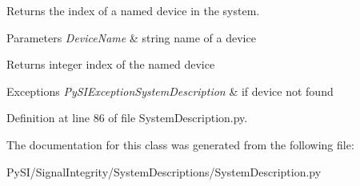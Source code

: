 Returns the index of a named device in the system. 


\begin{DoxyParams}{Parameters}
{\em Device\+Name} & string name of a device \\
\hline
\end{DoxyParams}
\begin{DoxyReturn}{Returns}
integer index of the named device 
\end{DoxyReturn}

\begin{DoxyExceptions}{Exceptions}
{\em Py\+S\+I\+Exception\+System\+Description} & if device not found \\
\hline
\end{DoxyExceptions}


Definition at line 86 of file System\+Description.\+py.



The documentation for this class was generated from the following file\+:\begin{DoxyCompactItemize}
\item 
Py\+S\+I/\+Signal\+Integrity/\+System\+Descriptions/System\+Description.\+py\end{DoxyCompactItemize}

